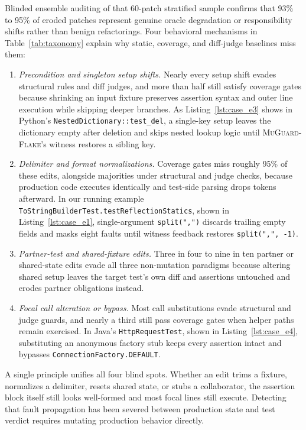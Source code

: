 

Blinded ensemble auditing of that 60-patch stratified sample confirms that 93\% to 95\% of eroded patches represent genuine oracle degradation or responsibility shifts rather than benign refactorings. Four behavioral mechanisms in Table~\ref{tab:taxonomy} explain why static, coverage, and diff-judge baselines miss them:
\begin{enumerate}[nosep]
    \item \emph{Precondition and singleton setup shifts.} Nearly every setup shift evades structural rules and diff judges, and more than half still satisfy coverage gates because shrinking an input fixture preserves assertion syntax and outer line execution while skipping deeper branches. As Listing~\ref{lst:case_e3} shows in Python's \texttt{NestedDictionary::test\_del}, a single-key setup leaves the dictionary empty after deletion and skips nested lookup logic until \textsc{MuGuard-Flake}'s witness restores a sibling key.
    \item \emph{Delimiter and format normalizations.} Coverage gates miss roughly 95\% of these edits, alongside majorities under structural and judge checks, because production code executes identically and test-side parsing drops tokens afterward. In our running example \texttt{ToStringBuilderTest.testReflectionStatics}, shown in Listing~\ref{lst:case_e1}, single-argument \texttt{split(",")} discards trailing empty fields and masks eight faults until witness feedback restores \texttt{split(",", -1)}.
    \item \emph{Partner-test and shared-fixture edits.} Three in four to nine in ten partner or shared-state edits evade all three non-mutation paradigms because altering shared setup leaves the target test's own diff and assertions untouched and erodes partner obligations instead.
    \item \emph{Focal call alteration or bypass.} Most call substitutions evade structural and judge guards, and nearly a third still pass coverage gates when helper paths remain exercised. In Java's \texttt{HttpRequestTest}, shown in Listing~\ref{lst:case_e4}, substituting an anonymous factory stub keeps every assertion intact and bypasses \texttt{ConnectionFactory.DEFAULT}.
\end{enumerate}

A single principle unifies all four blind spots. Whether an edit trims a fixture, normalizes a delimiter, resets shared state, or stubs a collaborator, the assertion block itself still looks well-formed and most focal lines still execute. Detecting that fault propagation has been severed between production state and test verdict requires mutating production behavior directly.

